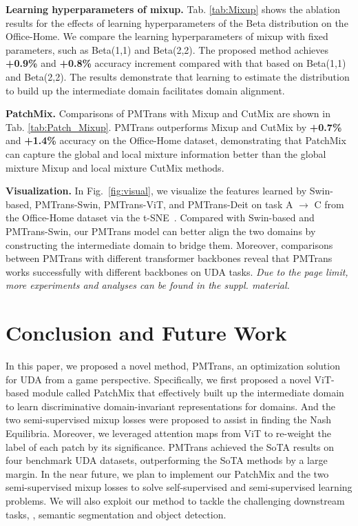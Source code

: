 \documentclass[10pt,twocolumn,letterpaper, ]{article}
\begin{document}
\noindent\textbf{Learning hyperparameters of mixup.}
Tab. \ref{tab:Mixup} shows the ablation results for the effects of learning hyperparameters of the Beta distribution on the Office-Home. We compare the learning hyperparameters of mixup with fixed parameters, such as Beta(1,1) and Beta(2,2). The proposed method achieves \textbf{+0.9\%} and \textbf{+0.8\%} accuracy increment compared with that based on Beta(1,1) and Beta(2,2). The results demonstrate that learning to estimate the distribution to build up the intermediate domain facilitates domain alignment.

\noindent\textbf{PatchMix.} Comparisons of PMTrans with Mixup \cite{ZhangCDL18} and CutMix \cite{YunHCOYC19} are shown in Tab. \ref{tab:Patch_Mixup}. PMTrans outperforms Mixup and CutMix by \textbf{+0.7\%} and \textbf{+1.4\%} accuracy on the Office-Home dataset, demonstrating that PatchMix can capture the global and local mixture information better than the global mixture Mixup and local mixture CutMix methods.

\noindent\textbf{Visualization.}
In Fig.~\ref{fig:visual}, we visualize the features learned by Swin-based, PMTrans-Swin, PMTrans-ViT, and PMTrans-Deit on task A $\rightarrow$ C from the Office-Home dataset via the t-SNE~\cite{DonahueJVHZTD14}. Compared with Swin-based and PMTrans-Swin, our PMTrans model can better align the two domains by constructing the intermediate domain to bridge them. Moreover, comparisons between PMTrans with different transformer backbones reveal that PMTrans works successfully with different backbones on UDA tasks.
\textit{Due to the page limit, more experiments and analyses can be found in the suppl. material.}
\vspace{-8pt}
\section{Conclusion and Future Work}
\vspace{-4pt}
In this paper, we proposed a novel method, PMTrans, an optimization solution for UDA from a game perspective. Specifically, we first proposed a novel ViT-based module called PatchMix that effectively built up the intermediate domain to learn discriminative domain-invariant representations for domains. And the two semi-supervised mixup losses were proposed to assist in finding the Nash Equilibria. Moreover, we leveraged attention maps from ViT to re-weight the label of each patch by its significance. PMTrans achieved the SoTA results on four benchmark UDA datasets, outperforming the SoTA methods by a large margin. In the near future, we plan to implement our PatchMix and the two semi-supervised mixup losses to solve self-supervised and semi-supervised learning problems. We will also exploit our method to tackle the challenging downstream tasks, \eg, semantic segmentation and object detection. 

\clearpage
{\small


}
\end{document}
